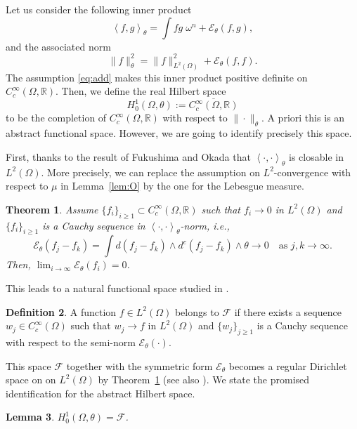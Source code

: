 \documentclass{amsart}
\newcommand{\lc}{\left<}
\newcommand{\rc}{\right>}
\newcommand{\om}{\omega}
\newcommand{\te}{\theta}
\newcommand{\Om}{\Omega}
\newcommand{\cF}{\mathcal{F}}
\newcommand{\bR}{\mathbb{R}}
\newcommand{\cali}[1]{\mathscr{#1}}
\newcommand{\Ec}{\cali{E}}
\newtheorem{thm}{Theorem}
\newtheorem{lem}[thm]{Lemma}
\theoremstyle{definition}
\newtheorem{defn}[thm]{Definition}
\numberwithin{thm}{section}
\numberwithin{equation}{section}
\renewcommand{\[}{\begin{equation}}
\renewcommand{\]}{\end{equation}}
\newcommand{\wed}{\wedge}
\begin{document}
Let us consider  the following inner product 
\[ \label{eq:inner-prod-te}
	\lc f, g \rc_\te =  \int f g \; \om^n + \Ec_\te( f, g),
\]
and the associated norm
\[ \label{eq:norm-te}
	\|f\|^2_\te  =  \|f\|_{L^2(\Om)}^2 +  \Ec_{\te}(f,f).
\]
The assumption \eqref{eq:add} makes this inner product  positive definite on $C^\infty_c(\Om, \bR)$. Then, we define  the real Hilbert space 
$$H^{1}_0(\Om, \te) := \overline{C^\infty_c(\Om,\bR)}$$  to be the completion of $C^\infty_c(\Om,\bR)$  with respect to  $\| \cdot\|_\te$. A priori this is an abstract functional space. However,  we are going to identify precisely this space.

First,  thanks to  the result of Fukushima and Okada \cite[Theorem~2.5]{FO87} that $\lc \cdot, \cdot\rc_\te$ is closable in $L^2(\Om)$. More precisely, we can replace the assumption on $L^2$-convergence  with respect to $\mu$ in Lemma~\ref{lem:O} by the one for the Lebesgue measure. 

\begin{thm} \label{lem:FO}
 Assume $\{f_i\}_{i\geq 1} \subset C^\infty_c(\Om,\bR)$ such that $f_i \to 0$ in $L^2(\Om)$ and $\{f_i\}_{i\geq 1}$ is a Cauchy sequence in $\lc \cdot, \cdot \rc_\te$-norm, i.e.,
\[\label{eq:Cauchy-seq}
 \Ec_\te(f_j- f_k) =\int d(f_j -f_k) \wed d^c (f_j-f_k) \wed \te \to 0 \quad\text{as } j,k \to \infty.
\]
Then, $\lim_{i\to \infty} \Ec_\te(f_i)  =0$.
\end{thm}

This leads to a natural functional space studied in \cite{Okada82}. 

\begin{defn} \label{defn:O} A function $f\in L^2(\Om)$ belongs to $\cF$ if there exists a sequence $w_j \in C^\infty_c(\Om)$ such that $w_j \to f $ in $L^2(\Om)$ and $\{w_j\}_{j\geq 1}$ is a Cauchy sequence with respect to the semi-norm $\Ec_\te (\cdot)$.
\end{defn}
This space $\cF$ together with the symmetric form $\Ec_\te$ becomes a regular Dirichlet space on on $L^2(\Om)$ by Theorem~\ref{lem:FO} (see also  \cite[Th\'eor\`em~4]{Okada82}). 
We state the promised identification for the abstract Hilbert space.

\begin{lem} \label{lem:identification}  $H^{1}_0(\Om,\te) = \cF$.
\end{lem}
\end{document}
